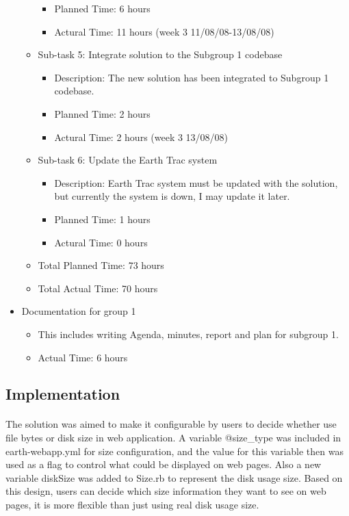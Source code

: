 \documentclass[10pt,a4,oneside]{article}
\begin{document}
\begin{itemize}
\begin{itemize}
\begin{itemize}
			\item Planned Time: 6 hours
			\item Actural Time: 11 hours (week 3 11/08/08-13/08/08)
			\end{itemize}
		\item Sub-task 5: Integrate solution to the Subgroup 1 codebase
			\begin{itemize}
			\item Description: The new solution has been integrated to Subgroup 1 codebase.
			\item Planned Time: 2 hours
			\item Actural Time: 2 hours (week 3 13/08/08)
			\end{itemize}
		\item Sub-task 6: Update the Earth Trac system
			\begin{itemize}
			\item Description: Earth Trac system must be updated with the solution, but currently the system is down, I may update it later.
			\item Planned Time: 1 hours
			\item Actural Time: 0 hours
			\end{itemize}
		\item Total Planned Time: 73 hours
		\item Total Actual Time: 70 hours
		\end{itemize}
\item Documentation for group 1	
		\begin{itemize}
		\item This includes writing Agenda, minutes, report and plan for subgroup 1.
		\item Actual Time: 6 hours
		\end{itemize}
\end{itemize}

\subsection*{Implementation}

\paragraph{}
The solution was aimed to make it configurable by users to decide whether use file bytes or disk size in web application. A variable @size\_type was included in earth-webapp.yml for size configuration, and the value for this variable then was used as a flag to control what could be displayed on web pages. Also a new variable diskSize was added to Size.rb to represent the disk usage size. Based on this design, users can decide which size information they want to see on web pages, it is more flexible than just using real disk usage size.
\end{document}
